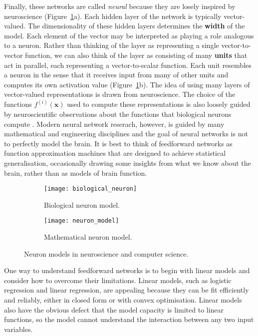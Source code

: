 Finally, these networks are called \emph{neural} because they are losely
inspired by neuroscience (Figure~\ref{fig:neuron}a). Each hidden layer of the
network is typically vector-valued. The dimensionality of these hidden layers
determines the \textbf{width} of the model. Each element of the vector may be
interpreted as playing a role analogous to a neuron. Rather than thinking of
the layer as representing a single vector-to-vector function, we can also think
of the layer as consisting of many \textbf{units} that act in parallel, each
representing a vector-to-scalar function. Each unit resembles a neuron in the
sense that it receives input from many of other units and computes its own
activation value (Figure~\ref{fig:neuron}b). The idea of using many layers of
vector-valued representations is drawn from neuroscience. The choice of the
functions $f^{(i)}(\boldsymbol{x})$ used to compute these representations is
also loosely guided by neuroscientific observations about the functions that
biological neurons compute \cite{doi:10.1113/jphysiol.1959.sp006308}. Modern
neural network reserach, however, is guided by many mathematical and
engineering disciplines and the goal of neural networks is not to perfectly
model the brain. It is best to think of feedforward networks as function
approximation machines that are designed to achieve statistical generalisation,
occasionally drawing some insights from what we know about the brain, rather
than as models of brain function.
\begin{figure}[h]
    \centering
    \begin{subfigure}[b]{0.495\linewidth}
        \texttt{[image: biological\_neuron]}
        \caption{Biological neuron model.}
    \end{subfigure}
    \begin{subfigure}[b]{0.495\linewidth}
        \texttt{[image: neuron\_model]}
        \caption{Mathematical neuron model.}
    \end{subfigure}
    \caption{Neuron models in neuroscience and computer science.}
    \label{fig:neuron}
\end{figure}


One way to understand feedforward networks is to begin with linear models and
consider how to overcome their limitations. Linear models, such as logistic
regression and linear regression, are appealing because they can be fit
efficiently and reliably, either in closed form or with convex optimisation.
Linear models also have the obvious defect that the model capacity is limited
to linear functions, so the model cannot understand the interaction between
any two input variables.

